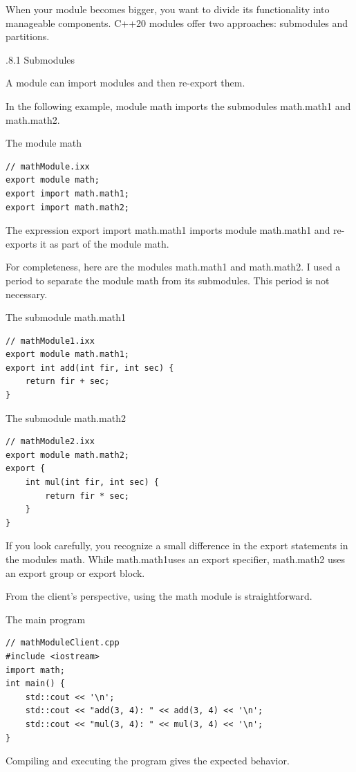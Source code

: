 When your module becomes bigger, you want to divide its functionality into manageable components. C++20 modules offer two approaches: submodules and partitions.

.8.1\hspace{0.2cm} Submodules

A module can import modules and then re-export them.

In the following example, module math imports the submodules math.math1 and math.math2.

\noindent
The module math
\begin{lstlisting}[style=styleCXX]
// mathModule.ixx
export module math;
export import math.math1;
export import math.math2;
\end{lstlisting}

The expression export import math.math1 imports module math.math1 and re-exports it as part of the module math.

For completeness, here are the modules math.math1 and math.math2. I used a period to separate the module math from its submodules. This period is not necessary.

\noindent
The submodule math.math1
\begin{lstlisting}[style=styleCXX]
// mathModule1.ixx
export module math.math1;
export int add(int fir, int sec) {
	return fir + sec;
}
\end{lstlisting}

\noindent
The submodule math.math2
\begin{lstlisting}[style=styleCXX]
// mathModule2.ixx
export module math.math2;
export {
	int mul(int fir, int sec) {
		return fir * sec;
	}
}
\end{lstlisting}

If you look carefully, you recognize a small difference in the export statements in the modules math. While math.math1uses an export specifier, math.math2 uses an export group or export block.

From the client’s perspective, using the math module is straightforward.

\noindent
The main program
\begin{lstlisting}[style=styleCXX]
// mathModuleClient.cpp
#include <iostream>
import math;
int main() {
	std::cout << '\n';
	std::cout << "add(3, 4): " << add(3, 4) << '\n';
	std::cout << "mul(3, 4): " << mul(3, 4) << '\n';
}
\end{lstlisting}

Compiling and executing the program gives the expected behavior.

